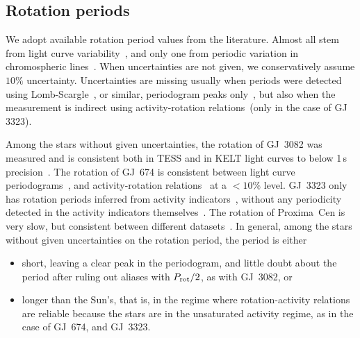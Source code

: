 \documentclass[twocolumn]{aastex631}
\begin{document}
\subsection{Rotation periods}
\label{sec:data:rotationperiods}
We adopt available rotation period values from the literature. Almost all stem from light curve variability~\citep{angus2018inferring, mazeh2015photometric, mcquillan2013stellar, mcquillan2014rotation, luger2017sevenplanet, stock2020carmenes, deleon202137, torres2017validation, stefansson2020habitable, zicher2022one, ment2021toi, rizzuto2020tess, gunther2020stellar}, and only one from periodic variation in chromospheric lines~\citep{demangeon2021warm}. When uncertainties are not given, we conservatively assume $10\%$ uncertainty. Uncertainties are missing usually when periods were detected using Lomb-Scargle~\citep{lomb1976leastsquares, scargle1982studies}, or similar, periodogram peaks only~\citep{gunther2020stellar, kiraga2007agerotationactivity, grankin2013magnetically, burt2014lickcarnegie}, but also when the measurement is indirect using activity-rotation relations~(only in the case of GJ 3323).

Among the stars without given uncertainties, the rotation of GJ~3082 was measured and is consistent both in TESS and in KELT light curves to below 1\,s precision~\citep{gunther2020stellar}. The rotation of GJ~674 is consistent between light curve periodograms~\citep{kiraga2007agerotationactivity}, and activity-rotation relations~\citep{boisse2011disentangling} at a $<10\%$ level. GJ~3323 only has rotation periods inferred from activity indicators~\citep{astudillo-defru2017magnetic}, without any periodicity detected in the activity indicators themselves~\citep{astudillo-defru2017harps}. The rotation of Proxima~Cen is very slow, but consistent between different datasets~\citep{anglada-escude2016terrestrial, kiraga2007agerotationactivity}. In general, among the stars without given uncertainties on the rotation period, the period is either 
\begin{itemize}
    \item short, leaving a clear peak in the periodogram, and little doubt about the period after ruling out aliases with $P_{\rm rot}/2$, as with GJ~3082, or
    \item longer than the Sun's, that is, in the regime where rotation-activity relations are reliable because the stars are in the unsaturated activity regime, as in the case of GJ~674, and GJ~3323.
\end{itemize} 
\end{document}
